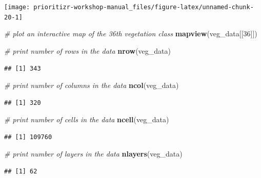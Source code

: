 \documentclass[12pt,]{book}
\newenvironment{Shaded}{\begin{snugshade}}{\end{snugshade}}
\newcommand{\KeywordTok}[1]{\textcolor[rgb]{0.13,0.29,0.53}{\textbf{#1}}}
\newcommand{\DecValTok}[1]{\textcolor[rgb]{0.00,0.00,0.81}{#1}}
\newcommand{\CommentTok}[1]{\textcolor[rgb]{0.56,0.35,0.01}{\textit{#1}}}
\newcommand{\NormalTok}[1]{#1}
\begin{document}
\begin{center}\texttt{[image: prioritizr-workshop-manual\_files/figure-latex/unnamed-chunk-20-1]} \end{center}

\begin{Shaded}
\begin{Highlighting}[]
\CommentTok{# plot an interactive map of the 36th vegetation class}
\KeywordTok{mapview}\NormalTok{(veg_data[[}\DecValTok{36}\NormalTok{]])}
\end{Highlighting}
\end{Shaded}

\begin{Shaded}
\begin{Highlighting}[]
\CommentTok{# print number of rows in the data}
\KeywordTok{nrow}\NormalTok{(veg_data)}
\end{Highlighting}
\end{Shaded}

\begin{verbatim}
## [1] 343
\end{verbatim}

\begin{Shaded}
\begin{Highlighting}[]
\CommentTok{# print number of columns  in the data}
\KeywordTok{ncol}\NormalTok{(veg_data)}
\end{Highlighting}
\end{Shaded}

\begin{verbatim}
## [1] 320
\end{verbatim}

\begin{Shaded}
\begin{Highlighting}[]
\CommentTok{# print number of cells in the data}
\KeywordTok{ncell}\NormalTok{(veg_data)}
\end{Highlighting}
\end{Shaded}

\begin{verbatim}
## [1] 109760
\end{verbatim}

\begin{Shaded}
\begin{Highlighting}[]
\CommentTok{# print number of layers in the data}
\KeywordTok{nlayers}\NormalTok{(veg_data)}
\end{Highlighting}
\end{Shaded}

\begin{verbatim}
## [1] 62
\end{verbatim}
\end{document}
